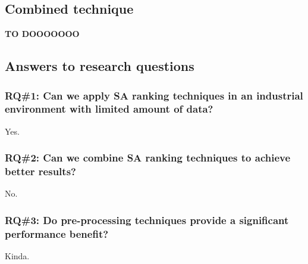 \subsection{Combined technique}
\textbf{TO DOOOOOOO}

\subsection{Answers to research questions}

\subsubsection{RQ\#1: Can we apply SA ranking techniques in an industrial environment with limited amount of data?}

Yes.

\subsubsection{RQ\#2: Can we combine SA ranking techniques to achieve better results?}

No.

\subsubsection{RQ\#3: Do pre-processing techniques provide a significant performance benefit?}

Kinda.
